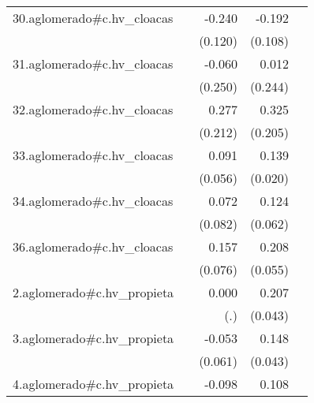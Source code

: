 {\begin{longtable}{l*{4}{D{.}{.}{-1}}}
\addlinespace
30.aglomerado#c.hv\_cloacas&                     &      -0.240\sym{*}  &      -0.192         &                     \\
            &                     &     (0.120)         &     (0.108)         &                     \\
\addlinespace
31.aglomerado#c.hv\_cloacas&                     &      -0.060         &       0.012         &                     \\
            &                     &     (0.250)         &     (0.244)         &                     \\
\addlinespace
32.aglomerado#c.hv\_cloacas&                     &       0.277         &       0.325         &                     \\
            &                     &     (0.212)         &     (0.205)         &                     \\
\addlinespace
33.aglomerado#c.hv\_cloacas&                     &       0.091         &       0.139\sym{***}&                     \\
            &                     &     (0.056)         &     (0.020)         &                     \\
\addlinespace
34.aglomerado#c.hv\_cloacas&                     &       0.072         &       0.124\sym{*}  &                     \\
            &                     &     (0.082)         &     (0.062)         &                     \\
\addlinespace
36.aglomerado#c.hv\_cloacas&                     &       0.157\sym{*}  &       0.208\sym{***}&                     \\
            &                     &     (0.076)         &     (0.055)         &                     \\
\addlinespace
2.aglomerado#c.hv\_propieta&                     &       0.000         &       0.207\sym{***}&                     \\
            &                     &         (.)         &     (0.043)         &                     \\
\addlinespace
3.aglomerado#c.hv\_propieta&                     &      -0.053         &       0.148\sym{***}&                     \\
            &                     &     (0.061)         &     (0.043)         &                     \\
\addlinespace
4.aglomerado#c.hv\_propieta&                     &      -0.098         &       0.108\sym{**} &                     \\

\end{longtable}}
